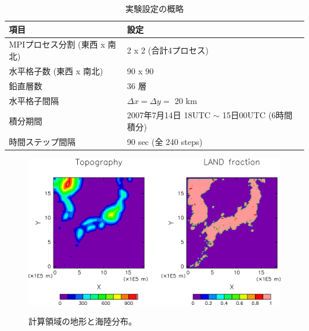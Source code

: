 \begin{table}[h]
\begin{center}
  \caption{実験設定の概略}
  \label{tab:grids}
  \begin{tabularx}{150mm}{|l|X|} \hline
    \rowcolor[gray]{0.9} 項目 & 設定 \\ \hline
    MPIプロセス分割 (東西 x 南北) & 2 x 2 (合計4プロセス) \\ \hline
    水平格子数 (東西 x 南北) & 90 x 90 \\ \hline
    鉛直層数                 & 36 層                  \\ \hline
    水平格子間隔             & $\Delta x = \Delta y =$ 20 km       \\ \hline
    積分期間 & 2007年7月14日 18UTC $\sim$ 15日00UTC (6時間積分) \\ \hline
    時間ステップ間隔 & 90 sec (全 240 steps) \\ \hline
  \end{tabularx}
\end{center}
\end{table}

\begin{figure}[tb]
\begin{center}
  \includegraphics[width=1.0\hsize]{./figure/real_domain.eps}\\
  \caption{計算領域の地形と海陸分布。}
  \label{fig:tutrial_real_domain}
\end{center}
\end{figure}


